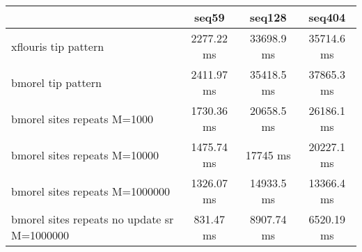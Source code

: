 \begin{tabular}{|l|c|c|c|}
\hline
 & seq59 & seq128 & seq404  \\
\hline
xflouris tip pattern & 2277.22 ms & 33698.9 ms & 35714.6 ms\\
\hline
bmorel tip pattern & 2411.97 ms & 35418.5 ms & 37865.3 ms\\
\hline
bmorel sites repeats M=1000 & 1730.36 ms & 20658.5 ms & 26186.1 ms\\
\hline
bmorel sites repeats M=10000 & 1475.74 ms & 17745 ms & 20227.1 ms\\
\hline
bmorel sites repeats M=1000000 & 1326.07 ms & 14933.5 ms & 13366.4 ms\\
\hline
bmorel sites repeats no update sr  M=1000000 & 831.47 ms & 8907.74 ms & 6520.19 ms\\
\hline
\end{tabular}
